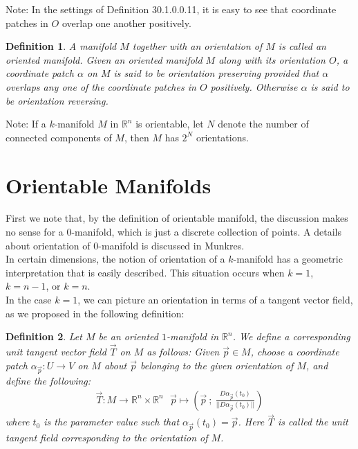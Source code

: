 \documentclass[11pt,oneside]{book}
\theoremstyle{break}
\theoremstyle{break}
\newtheorem{defn}{Definition}[corL]
\newcommand{\R}{\mathbb{R}}
\newcommand{\note}{\color{red}Note: \color{black}}
\begin{document}
\note In the settings of Definition 30.1.0.0.11, it is easy to see that coordinate patches in $O$ overlap one another positively.

\begin{defn}
A manifold $M$ together with an orientation of $M$ is called an oriented manifold. Given an oriented manifold $M$ along with its orientation $O$, a coordinate patch $\alpha$ on $M$ is said to be orientation preserving provided that $\alpha$ overlaps any one of the coordinate patches in $O$ positively. Otherwise $\alpha$ is said to be orientation reversing. 
\end{defn}

\note If a $k$-manifold $M$ in $\R^n$ is orientable, let $N$ denote the number of connected components of $M$, then $M$ has $2^{N}$ orientations. \\


\newpage
\section[Orientable Manifolds]{\color{red}Orientable Manifolds \color{black}}

First we note that, by the definition of orientable manifold, the discussion makes no sense for a $0$-manifold, which is just a discrete collection of points. A details about orientation of $0$-manifold is discussed in Munkres.\\

In certain dimensions, the notion of orientation of a $k$-manifold has a geometric interpretation that is easily described. This situation occurs when $k = 1$, $k=n-1$, or $k=n$.\\

In the case $k=1$, we can picture an orientation in terms of a tangent vector field, as we proposed in the following definition:
\begin{defn}
Let $M$ be an oriented $1$-manifold in $\R^n$. We define a corresponding unit tangent vector field $\vec{T}$ on $M$ as follows: Given $\vec{p} \in M$, choose a coordinate patch $\alpha_{\vec{p}} :U \to V$ on $M$ about $\vec{p}$ belonging to the given orientation of $M$, and define the following:
\begin{align*}
\vec{T}:M \to \R^n\times \R^n \ \ \ \vec{p}\mapsto \left(\vec{p}\ ;\ \frac{D\alpha_{\vec{p}}(t_0)}{||D\alpha_{\vec{p}}(t_0)||}\right)
\end{align*}
where $t_0$ is the parameter value such that $\alpha_{\vec{p}}(t_0 ) = \vec{p}$. Here $\vec{T}$ is called the unit tangent field corresponding to the orientation of $M$.
\end{defn}
\end{document}
